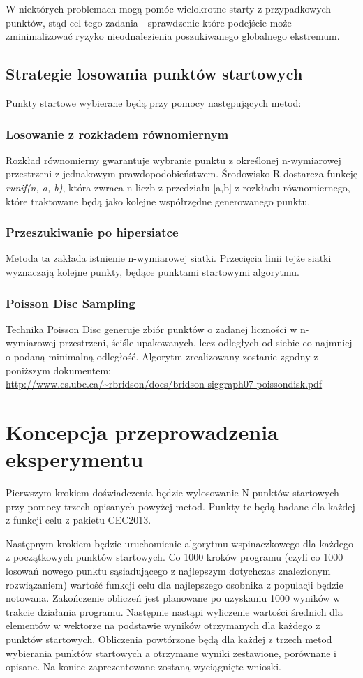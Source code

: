 \documentclass{article}
\begin{document}
	W niektórych problemach mogą pomóc wielokrotne starty z przypadkowych punktów, stąd cel tego zadania - sprawdzenie które podejście może zminimalizować ryzyko nieodnalezienia poszukiwanego globalnego ekstremum.
	
	
	\subsection{Strategie losowania punktów startowych}
	Punkty startowe wybierane będą przy pomocy następujących metod:
	
	\subsubsection{Losowanie z rozkładem równomiernym}
	Rozkład równomierny gwarantuje wybranie punktu z określonej n-wymiarowej przestrzeni z jednakowym prawdopodobieństwem. Środowisko R dostarcza funkcję \textit{runif(n, a, b)}, która zwraca n liczb z przedziału [a,b] z rozkładu równomiernego, które traktowane będą jako kolejne współrzędne generowanego punktu.
	
	\subsubsection{Przeszukiwanie po hipersiatce}
	Metoda ta zakłada istnienie n-wymiarowej siatki. Przecięcia linii tejże siatki wyznaczają kolejne punkty, będące punktami startowymi algorytmu.
	
	\subsubsection{Poisson Disc Sampling}
	Technika Poisson Disc generuje zbiór punktów o zadanej liczności w n-wymiarowej przestrzeni, ściśle upakowanych, lecz odległych od siebie co najmniej o podaną minimalną odległość. Algorytm zrealizowany zostanie zgodny z poniższym dokumentem:\\
	\url{http://www.cs.ubc.ca/~rbridson/docs/bridson-siggraph07-poissondisk.pdf}
	
	\section{Koncepcja przeprowadzenia eksperymentu}
	
	Pierwszym krokiem doświadczenia będzie wylosowanie N punktów startowych przy pomocy trzech opisanych powyżej metod. Punkty te będą badane dla każdej z funkcji celu z pakietu CEC2013.
	
	Następnym krokiem będzie uruchomienie algorytmu wspinaczkowego dla każdego z początkowych punktów startowych. Co 1000 kroków programu (czyli co 1000 losowań nowego punktu sąsiadującego z najlepszym dotychczas znalezionym rozwiązaniem) wartość funkcji celu dla najlepszego osobnika z populacji będzie notowana. Zakończenie obliczeń jest planowane po uzyskaniu 1000 wyników w trakcie działania programu. Następnie nastąpi wyliczenie wartości średnich dla elementów w wektorze na podstawie wyników otrzymanych dla każdego z punktów startowych. Obliczenia powtórzone będą dla każdej z trzech metod wybierania punktów startowych a otrzymane wyniki zestawione, porównane i opisane. Na koniec zaprezentowane zostaną wyciągnięte wnioski.
	
\end{document}
